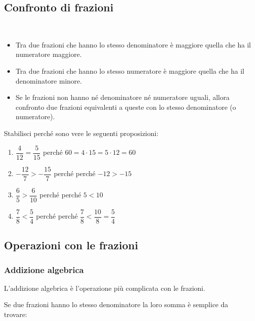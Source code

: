 \subsection{Confronto di frazioni}
\label{sub:razionali_confronto}

\begin{definizione}
~

\begin{itemize}
 \item Tra due frazioni che hanno lo stesso denominatore è maggiore quella
che ha il numeratore maggiore.
 \item Tra due frazioni che hanno lo stesso numeratore è maggiore quella
che ha il denominatore minore.
 \item Se le frazioni non hanno né denominatore né numeratore uguali,
allora confronto due frazioni equivalenti a queste con lo stesso
denominatore (o numeratore).
\end{itemize}
\end{definizione}

\begin{esempio}
 Stabilisci perché sono vere le seguenti proposizioni:
 \begin{enumerate} [noitemsep]
  \item \(\dfrac{4}{12} = \dfrac{5}{15}\)
    \qquad perché \quad \(60 = 4 \cdot 15 = 5 \cdot 12 = 60\)
  \item \(-\dfrac{12}{7} > -\dfrac{15}{7}\)
    \qquad perché \quad perché \(-12 > -15\)
  \item \(\dfrac{6}{5} > \dfrac{6}{10}\)
    \qquad perché \quad perché \(5 < 10\)
  \item \(\dfrac{7}{8} < \dfrac{5}{4}\)
    \qquad perché \quad perché \(\dfrac{7}{8} < \dfrac{10}{8} =
\dfrac{5}{4}\)
 \end{enumerate}
\end{esempio}

\subsection{Operazioni con le frazioni}
\label{sub:razionali_operazioni}

\subsubsection{Addizione algebrica}

L'addizione algebrica è l'operazione più complicata con le frazioni.

Se due frazioni hanno lo stesso denominatore la loro somma è semplice da
trovare:

